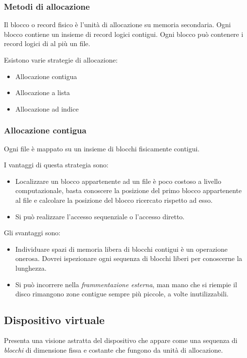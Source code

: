 \documentclass
[10pt,        %
 a4paper,     %
 onecolumn,   %
 fleqn,       %
 oneside,     %
 notitlepage, %
]{article}    %
\begin{document}
\subsubsection{Metodi di allocazione}
Il blocco o record fisico è l'unità di allocazione su memoria secondaria. Ogni blocco contiene un insieme di record logici contigui. Ogni blocco può contenere i record logici di al più un file.

Esistono varie strategie di allocazione:
\begin{itemize}
    \item Allocazione contigua
    \item Allocazione a lista
    \item Allocazione ad indice
\end{itemize}

\subsubsection{Allocazione contigua}
Ogni file è mappato su un insieme di blocchi fisicamente contigui.

I vantaggi di questa strategia sono:
\begin{itemize}
    \item Localizzare un blocco appartenente ad un file è poco costoso a livello computazionale, basta conoscere la posizione del primo blocco appartenente al file e calcolare la posizione del blocco ricercato rispetto ad esso.
    \item Si può realizzare l'accesso sequenziale o l'accesso diretto.
\end{itemize}
Gli svantaggi sono:
\begin{itemize}
    \item Individuare spazi di memoria libera di blocchi contigui è un operazione onerosa. Dovrei ispezionare ogni sequenza di blocchi liberi per conoscerne la lunghezza.
    \item Si può incorrere nella \textit{frammentazione esterna}, man mano che si riempie il disco rimangono zone contigue sempre più piccole, a volte inutilizzabili.
\end{itemize}

\subsection{Dispositivo virtuale}
Presenta una visione astratta del dispositivo che appare come una sequenza di \textit{blocchi} di dimensione fissa e costante che fungono da unità di allocazione.
\end{document}
